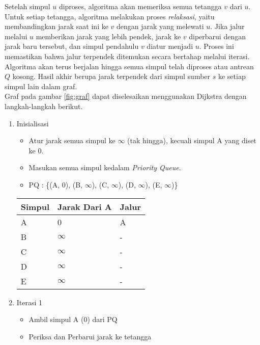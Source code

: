 Setelah simpul $u$ diproses, algoritma akan memeriksa semua tetangga $v$ dari $u$. Untuk setiap tetangga, algoritma melakukan proses \textit{relaksasi}, yaitu membandingkan jarak saat ini ke $v$ dengan jarak yang melewati $u$. Jika jalur melalui $u$ memberikan jarak yang lebih pendek, jarak ke $v$ diperbarui dengan jarak baru tersebut, dan simpul pendahulu $v$ diatur menjadi $u$. Proses ini memastikan bahwa jalur terpendek ditemukan secara bertahap melalui iterasi. Algoritma akan terus berjalan hingga semua simpul telah diproses atau antrean $Q$ kosong. Hasil akhir berupa jarak terpendek dari simpul sumber $s$ ke setiap simpul lain dalam graf.
\\
Graf pada gambar \ref{fig:graf} dapat diselesaikan menggunakan Dijkstra dengan langkah-langkah berikut.
\begin{enumerate}
    \item Inisialisasi
    \begin{itemize}
        \item Atur jarak semua simpul ke $\infty$ (tak hingga), kecuali simpul A yang diset ke 0.
        \item Masukan semua simpul kedalam \textit{Priority Queue}.
        \item PQ : \{(A, 0), (B, $\infty$), (C, $\infty$), (D, $\infty$), (E, $\infty$)\}
    \end{itemize}
    \begin{table}[h]
        \begin{tabular}{|l|l|l|}
        \hline
            \textbf{Simpul} & \textbf{Jarak Dari A} & Jalur \\ \hline
            A               & 0                     & A     \\ \hline
            B               & $\infty$              & -     \\ \hline
            C               & $\infty$              & -     \\ \hline
            D               & $\infty$              & -     \\ \hline
            E               & $\infty$              & -     \\ \hline
        \end{tabular}
    \end{table}
\newpage
    \item Iterasi 1
    \begin{itemize}
        \item Ambil simpul A (0) dari PQ
        \item Periksa dan Perbarui jarak ke tetangga

\end{itemize}
\end{enumerate}
